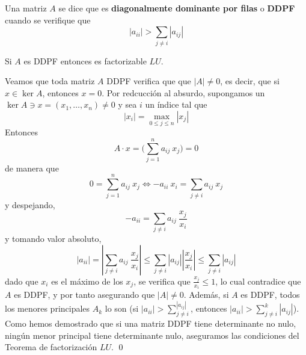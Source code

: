     \begin{defin}
        Una matriz $A$ se dice que es \textbf{diagonalmente dominante por filas} o \textbf{DDPF} cuando se verifique que 
        $$|a_{ii}| > \sum_{j \neq i} |a_{ij}| $$
    \end{defin}
    \begin{prop}
        Si $A$ es DDPF entonces es factorizable $LU$.
    \end{prop}
    \begin{dem}
        Veamos que toda matriz $A$ DDPF verifica que que $|A| \neq 0$, es decir, que si $x \in \ker A$, entonces $x=0$. Por redcucción al absurdo, supongamos un $\ker A  \ni x=(x_1, \ldots, x_n)\neq 0$ y sea $i$ un índice tal que 
        $$|x_i|=\max_{0 \leq j \leq n} |x_j|$$
        Entonces 
        $$A \cdot x=\Big(\sum_{j=1}^n a_{ij} \: x_j\Big)=0$$
        de manera que 
        $$0=\sum_{j=1}^n a_{ij} \: x_j \iff -a_{ii}\: x_i=\sum_{j\neq i} a_{ij} \: x_j$$
        y despejando,
        $$-a_{ii} =\sum_{j\neq i} a_{ij} \: \dfrac{x_j}{x_i}$$
        y tomando valor absoluto, 
        $$|a_{ii}| = \left|\sum_{j\neq i} a_{ij} \: \dfrac{x_j}{x_i}\right| \leq \sum_{j \neq i } |a_{ij}| \left| \dfrac{x_j}{x_i}\right| \leq \sum_{j \neq i } |a_{ij}| $$
         dado que $x_i$ es el máximo de los $x_j$, se verifica que $\frac{x_j}{x_i} \leq 1$, lo cual contradice que $A$ es DDPF, y por tanto asegurando que $|A| \neq 0$. Además, si $A$ es DDPF, todos los menores principales $A_k$ lo son (si $\displaystyle |a_{ii}| > \sum_{j \neq i }^ |a_{ij}|$, entonces $\displaystyle |a_{ii}| > \sum_{j \neq i}^k |a_{ij}|$). Como hemos demostrado que si  una matriz DDPF tiene determinante no nulo, ningún menor principal tiene determinante nulo, aseguramos las condiciones del Teorema de factorización $LU$.
    \qed\end{dem}
